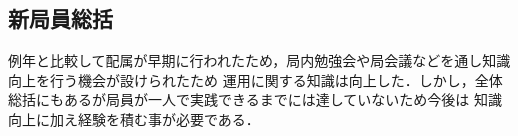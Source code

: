 \subsection*{新局員総括}

例年と比較して配属が早期に行われたため，局内勉強会や局会議などを通し知識向上を行う機会が設けられたため
運用に関する知識は向上した．しかし，全体総括にもあるが局員が一人で実践できるまでには達していないため今後は
知識向上に加え経験を積む事が必要である．